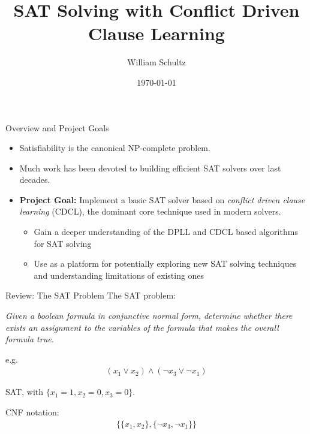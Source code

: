 \documentclass{beamer}
\title{SAT Solving with Conflict Driven Clause Learning}
\author{William Schultz}
\institute{CS 7240 Final Project}
\date{\today}
\begin{document}
\newcommand{\green}[1]{\textcolor{green}{#1}}
\newcommand{\red}[1]{\textcolor{red}{#1}}

\begin{frame}
    \titlepage
\end{frame}

\begin{frame}{Overview and Project Goals}
\begin{itemize}
    \item Satisfiability is the canonical NP-complete problem.
    
    \item Much work has been devoted to building efficient SAT solvers over last decades.\\
    
    \item \textbf{Project Goal:} Implement a basic SAT solver based on \textit{conflict driven clause learning} (CDCL), the dominant core technique used in modern solvers.
    \begin{itemize}
        \item Gain a deeper understanding of the DPLL and CDCL based algorithms for SAT solving
        \item Use as a platform for potentially exploring new SAT solving techniques and understanding limitations of existing ones
    \end{itemize}
\end{itemize}
\end{frame}

\begin{frame}{Review: The SAT Problem}
    The SAT problem:
    \vspace{12pt}

    \textit{Given a boolean formula in conjunctive normal form, determine whether there exists an assignment to the variables of the formula that makes the overall formula true.}

    \pause
    \vspace{12pt}
    e.g.
    \begin{align*}
        (x_1 \vee x_2) \wedge (\neg x_3 \vee \neg x_1)
    \end{align*}
    \pause
    \begin{center}
        SAT, with $\{x_1=1,x_2=0,x_3=0\}$. 
    \end{center}
    \pause
    CNF notation:
    \begin{align*}
        \{\{x_1, x_2\}, \{\neg x_3, \neg x_1\}\}
    \end{align*}
\end{frame}
\end{document}

